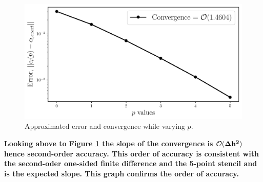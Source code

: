 \begin{figure}[h]
    \centering
    \includegraphics[width = 0.9\linewidth]{tasks/figs/cl_err.pdf}
    \caption[Approximated Residual Error]{Approximated error and convergence while varying $p$.}
    \label{fig:cl_err}
\end{figure}

\begin{fminipage}{0.9\linewidth}
    \textbf{Looking above to Figure \ref{fig:cl_err} the slope of the convergence is $\bf \mathcal{O}(\Delta h^2)$ hence second-order accuracy. This order of accuracy is consistent with the second-oder one-sided finite difference and the 5-point stencil and is the expected slope. This graph confirms the order of accuracy.}
\end{fminipage}